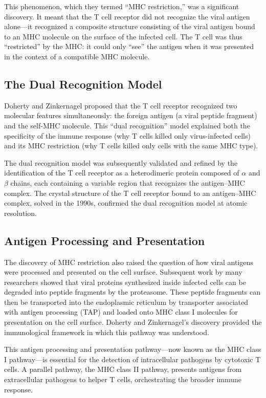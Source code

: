 This phenomenon, which they termed ``MHC restriction,'' was a significant discovery. It meant that the T cell receptor did not recognize the viral antigen alone---it recognized a composite structure consisting of the viral antigen bound to an MHC molecule on the surface of the infected cell. The T cell was thus ``restricted'' by the MHC: it could only ``see'' the antigen when it was presented in the context of a compatible MHC molecule.

\subsection{The Dual Recognition Model}

Doherty and Zinkernagel proposed that the T cell receptor recognized two molecular features simultaneously: the foreign antigen (a viral peptide fragment) and the self-MHC molecule. This ``dual recognition'' model explained both the specificity of the immune response (why T cells killed only virus-infected cells) and its MHC restriction (why T cells killed only cells with the same MHC type).

The dual recognition model was subsequently validated and refined by the identification of the T cell receptor as a heterodimeric protein composed of $\alpha$ and $\beta$ chains, each containing a variable region that recognizes the antigen--MHC complex. The crystal structure of the T cell receptor bound to an antigen--MHC complex, solved in the 1990s, confirmed the dual recognition model at atomic resolution.

\subsection{Antigen Processing and Presentation}

The discovery of MHC restriction also raised the question of how viral antigens were processed and presented on the cell surface. Subsequent work by many researchers showed that viral proteins synthesized inside infected cells can be degraded into peptide fragments by the proteasome. These peptide fragments can then be transported into the endoplasmic reticulum by transporter associated with antigen processing (TAP) and loaded onto MHC class I molecules for presentation on the cell surface. Doherty and Zinkernagel's discovery provided the immunological framework in which this pathway was understood.

This antigen processing and presentation pathway---now known as the MHC class I pathway---is essential for the detection of intracellular pathogens by cytotoxic T cells. A parallel pathway, the MHC class II pathway, presents antigens from extracellular pathogens to helper T cells, orchestrating the broader immune response.

